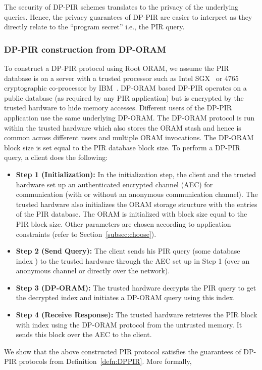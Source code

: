 \documentclass[USenglish,oneside,twocolumn]{article}
\newcommand{\ourprotocol}{Root ORAM}
\begin{document}
The security of DP-PIR schemes translates to the privacy of the underlying queries. Hence, the privacy guarantees of DP-PIR are easier to interpret as they directly relate to the ``program secret'' i.e., the PIR query.

\vspace{-6mm}
\subsubsection{DP-PIR construction from DP-ORAM}\label{subsec:DPPIRProtocol}
\vspace{-4mm}
\noindent To construct a DP-PIR protocol using \ourprotocol{}, we assume the PIR database is on a server with a trusted processor such as Intel SGX~\cite{sgxreference} or 4765 cryptographic co-processor by IBM~\cite{ibmcryptocards}. DP-ORAM based DP-PIR operates on a public database (as required by any PIR application) but is encrypted by the trusted hardware to hide memory accesses. Different users of the DP-PIR application use the same underlying DP-ORAM. 
The DP-ORAM protocol is run within the trusted hardware which also stores the ORAM stash and hence is common across different users and multiple ORAM invocations.
The DP-ORAM block size is set equal to the PIR database block size. To perform a DP-PIR query, a client does the following: 
\begin{itemize}
\itemsep0em
\item \textbf{Step 1 (Initialization):} In the initialization step, the client and the trusted hardware set up an authenticated encrypted channel (AEC) for communication (with or without an anonymous communication channel). The trusted hardware also initializes the ORAM storage structure with the entries of the PIR database. The ORAM is initialized with block size equal to the PIR block size. Other parameters are chosen according to application constraints (refer to Section~\ref{subsec:choose}).
\item \textbf{Step 2 (Send Query): }The client sends his PIR query (some database index ) to the trusted hardware through the AEC set up in Step 1 (over an anonymous channel or directly over the network).
\item \textbf{Step 3 (DP-ORAM): }The trusted hardware decrypts the PIR query to get the decrypted index  and initiates a DP-ORAM query using this index.
\item \textbf{Step 4 (Receive Response): }The trusted hardware retrieves the PIR block with index  using the DP-ORAM protocol from the untrusted memory. It sends this block over the AEC to the client. 
\end{itemize}
We show that the above constructed PIR protocol satisfies the guarantees of DP-PIR protocols from Definition~\ref{defn:DPPIR}. More formally,
\end{document}
